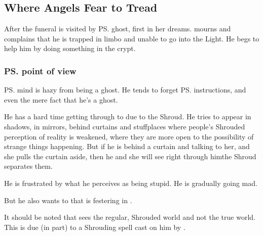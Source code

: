 \subsection{Where Angels Fear to Tread}
After the funeral \Tiroco{} is visited by \ps{\Icor} ghost, first in her dreams. 
\Icor{} mourns and complains that he is trapped in limbo and unable to go into the Light. He begs \Tiroco{} to help him by doing something in the crypt.






\subsubsection{\ps{\Icor} point of view}
\ps{\Icor} mind is hazy from being a ghost. 
He tends to forget \ps{\Psyrex}{} instructions, and even the mere fact that he's a ghost.

He has a hard time getting through to \Tiroco{} due to the Shroud. 
He tries to appear in shadows, in mirrors, behind curtains and stuff\dash places where people's Shrouded perception of reality is weakened, where they are more open to the possibility of strange things happening. 
But if he is behind a curtain and talking to her, and she pulls the curtain aside, then he  and she will see right through him\dash the Shroud separates them. 

He is frustrated by what he perceives as \Tiroco{} being stupid. 
He is gradually going mad. 


But he also wants to  that is festering in \Malcur. 

It should be noted that \Icor{} sees the regular, Shrouded world and not the true world. 
This is due (in part) to a Shrouding spell cast on him by \LocarPsyrex. 





